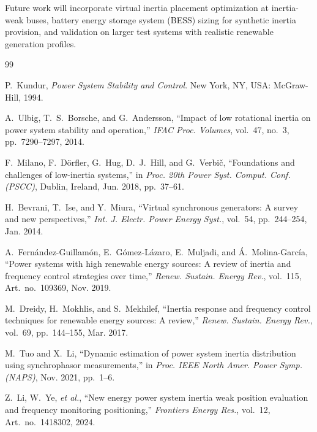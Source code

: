 \documentclass[]{ieeeaccess}
\begin{document}
Future work will incorporate virtual inertia placement optimization at inertia-weak buses, battery energy storage system (BESS) sizing for synthetic inertia provision, and validation on larger test systems with realistic renewable generation profiles.


\begin{thebibliography}{99}

P.~Kundur, \textit{Power System Stability and Control}. New York, NY, USA: McGraw-Hill, 1994.

A.~Ulbig, T.~S.~Borsche, and G.~Andersson, ``Impact of low rotational inertia on power system stability and operation,'' \textit{IFAC Proc. Volumes}, vol.~47, no.~3, pp.~7290--7297, 2014.

F.~Milano, F.~D\"{o}rfler, G.~Hug, D.~J.~Hill, and G.~Verbi\v{c}, ``Foundations and challenges of low-inertia systems,'' in \textit{Proc. 20th Power Syst. Comput. Conf. (PSCC)}, Dublin, Ireland, Jun. 2018, pp.~37--61.

H.~Bevrani, T.~Ise, and Y.~Miura, ``Virtual synchronous generators: A survey and new perspectives,'' \textit{Int. J. Electr. Power Energy Syst.}, vol.~54, pp.~244--254, Jan. 2014.

A.~Fern\'{a}ndez-Guillam\'{o}n, E.~G\'{o}mez-L\'{a}zaro, E.~Muljadi, and \'{A}.~Molina-Garc\'{i}a, ``Power systems with high renewable energy sources: A review of inertia and frequency control strategies over time,'' \textit{Renew. Sustain. Energy Rev.}, vol.~115, Art.~no.~109369, Nov. 2019.

M.~Dreidy, H.~Mokhlis, and S.~Mekhilef, ``Inertia response and frequency control techniques for renewable energy sources: A review,'' \textit{Renew. Sustain. Energy Rev.}, vol.~69, pp.~144--155, Mar. 2017.

M.~Tuo and X.~Li, ``Dynamic estimation of power system inertia distribution using synchrophasor measurements,'' in \textit{Proc. IEEE North Amer. Power Symp. (NAPS)}, Nov. 2021, pp.~1--6.

Z.~Li, W.~Ye, \textit{et al.}, ``New energy power system inertia weak position evaluation and frequency monitoring positioning,'' \textit{Frontiers Energy Res.}, vol.~12, Art.~no.~1418302, 2024.

\end{thebibliography}
\end{document}
